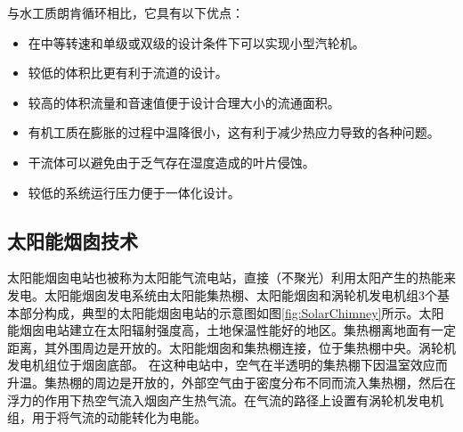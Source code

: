 与水工质朗肯循环相比，它具有以下优点：
\begin{itemize}
	\item 在中等转速和单级或双级的设计条件下可以实现小型汽轮机。
    \item 较低的体积比更有利于流道的设计。
    \item 较高的体积流量和音速值便于设计合理大小的流通面积。
    \item 有机工质在膨胀的过程中温降很小，这有利于减少热应力导致的各种问题。
	\item 干流体可以避免由于乏气存在湿度造成的叶片侵蚀。
	\item 较低的系统运行压力便于一体化设计。
  \end{itemize}

\subsection{太阳能烟囱技术}
\label{sec:sc}
太阳能烟囱电站也被称为太阳能气流电站，直接（不聚光）利用太阳产生的热能来发电。太阳能烟囱发电系统由太阳能集热棚、太阳能烟囱和涡轮机发电机组3个基本部分构成，典型的太阳能烟囱电站的示意图如图\ref{fig:SolarChimney}所示。太阳能烟囱电站建立在太阳辐射强度高，土地保温性能好的地区。集热棚离地面有一定距离，其外围周边是开放的。太阳能烟囱和集热棚连接，位于集热棚中央。涡轮机发电机组位于烟囱底部。
在这种电站中，空气在半透明的集热棚下因温室效应而升温。集热棚的周边是开放的，外部空气由于密度分布不同而流入集热棚，然后在浮力的作用下热空气流入烟囱产生热气流。在气流的路径上设置有涡轮机发电机组，用于将气流的动能转化为电能。

